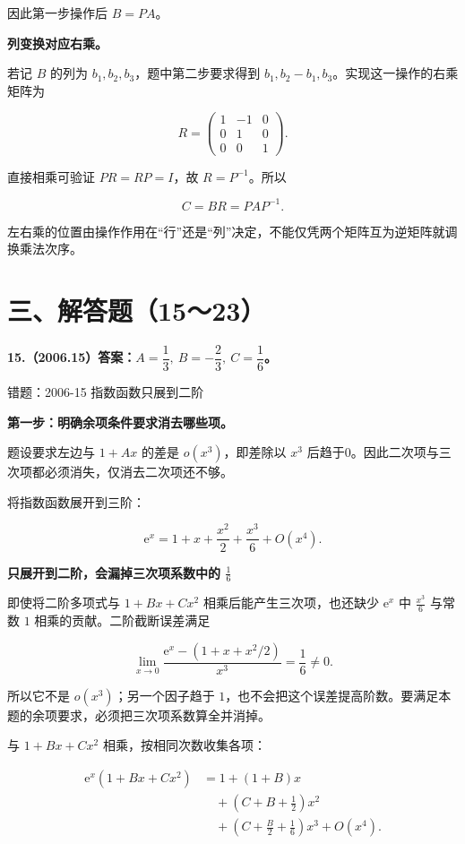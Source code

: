 \documentclass[UTF8,11pt,fontset=windows]{ctexart}
\begin{document}
因此第一步操作后 $B=PA$。

\textbf{列变换对应右乘。}

若记 $B$ 的列为 $b_1,b_2,b_3$，题中第二步要求得到 $b_1,b_2-b_1,b_3$。实现这一操作的右乘矩阵为

$$
R=\begin{pmatrix}1&-1&0\\0&1&0\\0&0&1\end{pmatrix}.
$$

直接相乘可验证 $PR=RP=I$，故 $R=P^{-1}$。所以

$$
\boxed{C=BR=PAP^{-1}.}
$$

左右乘的位置由操作作用在“行”还是“列”决定，不能仅凭两个矩阵互为逆矩阵就调换乘法次序。

\clearpage

\section*{三、解答题（15～23）}

\textbf{15.（2006.15）答案：$A=\dfrac13,\ B=-\dfrac23,\ C=\dfrac16$。}

\begingroup\color{gray}错题：2006-15 指数函数只展到二阶\par\endgroup

\textbf{第一步：明确余项条件要求消去哪些项。}

题设要求左边与 $1+Ax$ 的差是 $o(x^3)$，即差除以 $x^3$ 后趋于0。因此二次项与三次项都必须消失，仅消去二次项还不够。

将指数函数展开到三阶：

$$
\mathrm e^x=1+x+\frac{x^2}2+\frac{x^3}6+O(x^4).
$$

{\bfseries 只展开到二阶，会漏掉三次项系数中的 $\frac16$\par}
即使将二阶多项式与 $1+Bx+Cx^2$ 相乘后能产生三次项，也还缺少 $\mathrm e^x$ 中 $\frac{x^3}{6}$ 与常数 $1$ 相乘的贡献。二阶截断误差满足

$$
\lim_{x\to0}\frac{\mathrm e^x-(1+x+x^2/2)}{x^3}=\frac16\ne0.
$$

所以它不是 $o(x^3)$；另一个因子趋于 $1$，也不会把这个误差提高阶数。要满足本题的余项要求，必须把三次项系数算全并消掉。

与 $1+Bx+Cx^2$ 相乘，按相同次数收集各项：

$$
\begin{aligned}
\mathrm e^x(1+Bx+Cx^2)
&=1+(1+B)x\\
&\quad+\left(C+B+\frac12\right)x^2\\
&\quad+\left(C+\frac B2+\frac16\right)x^3+O(x^4).
\end{aligned}
$$
\end{document}

